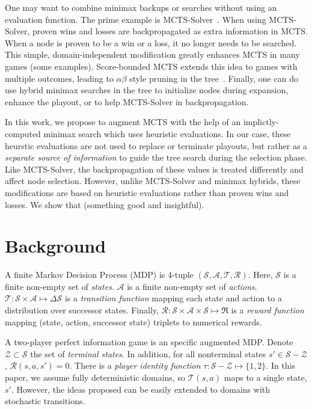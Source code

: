 \documentclass{article}
\newcommand{\cA}{\mathcal{A}}
\newcommand{\cR}{\mathcal{R}}
\newcommand{\cS}{\mathcal{S}}
\newcommand{\cT}{\mathcal{T}}
\newcommand{\cZ}{\mathcal{Z}}
\newcommand{\marcl}[1]{\textbf{\color{red} /* #1 (marcl) */}}
\begin{document}

One may want to combine minimax backups or searches without using an evaluation function. 
The prime example is MCTS-Solver~\cite{Winands08Solver}. When using 
MCTS-Solver, proven wins and losses are backpropagated as extra information in MCTS. When a node is proven to be a 
win or a loss, it no longer needs to be searched. This simple, domain-independent modification greatly enhances 
MCTS in many games (some examples). Score-bounded MCTS extends this idea to games with multiple outcomes, 
leading to $\alpha \beta$ style pruning in the tree~\cite{Cazenave10ScoreBounded}. Finally, one can do use hybrid
minimax searches in the tree to initialize nodes during expansion, enhance the playout, or to help MCTS-Solver 
in backpropagation. 

In this work, we propose to augment MCTS with the help of an implictly-computed minimax search which uses
heuristic evaluations. In our case, these heurstic evaluations are not used to replace or terminate playouts, but 
rather as a {\it separate source of information} to guide the tree search during the selection phase. Like MCTS-Solver, 
the backpropagation of these values is treated differently and affect node selection. However, unlike MCTS-Solver and 
minimax hybrids, these modifications are based on heuristic evaluations rather than proven wins and losses. 
We show that (something good and insightful). 

\section{Background}


A finite Markov Decision Process (MDP) is 4-tuple $(\cS, \cA, \cT, \cR)$. Here, $\cS$ is a finite non-empty set of {\it states}. 
$\cA$ is a finite non-empty set of {\it actions}. $\cT : \cS \times \cA \mapsto \Delta \cS$ is a {\it transition function} mapping 
each state and action to a distribution over successor states. Finally, $\cR : \cS \times \cA \times \cS \mapsto \Re$ 
is a {\it reward function} mapping (state, action, successor state) triplets to numerical rewards. 

A two-player perfect information game is an specific augmented MDP. Denote $\cZ \subset \cS$ the set of {\it terminal states}. 
In addition, for all nonterminal states $s' \in \cS - \cZ$, $\cR(s,a,s') = 0$. 
There is a {\it player identity function} $\tau : \cS - \cZ \mapsto \{1,2\}$. 
In this paper, we assume fully deterministic domains, so $\cT(s,a)$ maps to a single state, $s'$. However, the ideas proposed can 
be easily extended to domains with stochastic transitions.
\end{document}
